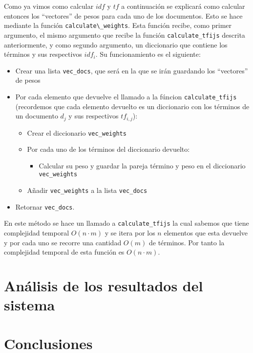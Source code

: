 \documentclass[runningheads]{llncs}
\begin{document}
	Como ya vimos como calcular $idf$ y $tf$ a continuaci\'on se explicar\'a como calcular entonces los ``vectores'' de pesos para cada uno de los documentos.  Esto se hace mediante la funci\'on \verb|calculate\_weights|. Esta funci\'on recibe, como primer argumento, el mismo argumento que recibe la funci\'on \verb|calculate_tfijs| descrita anteriormente, y como segundo argumento, un diccionario que contiene los t\'erminos y sus respectivos $idf_i$. Su funcionamiento es el siguiente:
	
	\begin{itemize}
		\item Crear una lista \verb|vec_docs|, que ser\'a en la que se ir\'an guardando los ``vectores'' de pesos
		\item Por cada elemento que devuelve el llamado a la f\'uncion \verb|calculate_tfijs| (recordemos que cada elemento devuelto es un diccionario con los t\'erminos de un documento $d_j$ y sus respectivos $tf_{i,j}$):
		\begin{itemize}
			\item Crear el diccionario \verb|vec_weights|
			\item Por cada uno de los t\'erminos del diccionario devuelto:
			\begin{itemize}
				\item Calcular su peso y guardar la pareja t\'ermino y peso en el diccionario \verb|vec_weights|
			\end{itemize}
			\item A\~{n}adir \verb|vec_weights| a la lista \verb|vec_docs|
		\end{itemize}
		\item Retornar \verb|vec_docs|.
	\end{itemize}
	
	En este m\'etodo se hace un llamado a \verb|calculate_tfijs| la cual sabemos que tiene complejidad temporal $O(n\cdot m)$ y se itera por los $n$ elementos que esta devuelve y por cada uno se recorre una cantidad $O(m)$ de t\'erminos. Por tanto la complejidad temporal de esta funci\'on es $O(n\cdot m)$.
		
	\section{An\'alisis de los resultados del sistema}
	
	
	\section{Conclusiones}
	
	
	
	\begin{thebibliography}{1}
		
	\end{thebibliography}
\end{document}
